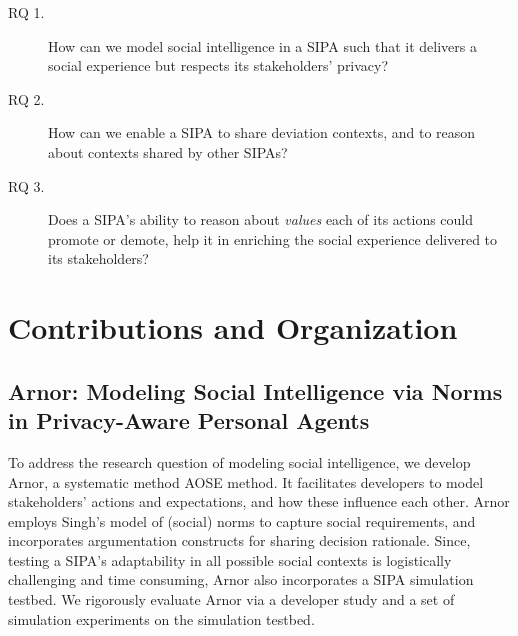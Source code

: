 \documentclass[11pt,          %
               phd,           %
               onehalfspacing %
               ]{ncsuthesis}
\newcommand{\fsl}{\textsl}
\newcommand{\frameworkA}{Arnor\xspace}
\begin{document}
\begin{description}

\item[RQ 1.] How can we model social intelligence in a SIPA such that it
delivers a social experience but respects its stakeholders' privacy?

\item[RQ 2.] How can we enable a SIPA to share deviation contexts, and to
reason about contexts shared by other SIPAs? 



\item[RQ 3.] Does a SIPA's ability to reason about \fsl{values} each of
its actions could promote or demote, help it in enriching the social
experience delivered to its stakeholders?

\end{description}

\section{Contributions and Organization}
\label{sec:intro-contributions}

\subsection[Modeling Soical Intelligence via Norms]{\frameworkA: Modeling Social Intelligence via Norms in 
Privacy-Aware Personal Agents}

To address the research question of modeling social intelligence, we
develop \frameworkA \citep{Ajmeri-AAMAS17-Arnor}, a systematic method
AOSE method. It facilitates developers to model stakeholders' actions
and expectations, and how these influence each other. \frameworkA
employs Singh's \citep{Singh-2013-Norms} model of (social) norms to
capture social requirements, and incorporates argumentation constructs
\citep{BenchCapon-2007-Argumentation+AI} for sharing decision rationale.
Since, testing a SIPA's adaptability in all possible social contexts is
logistically challenging and time consuming, \frameworkA also
incorporates a SIPA simulation testbed. We rigorously evaluate
\frameworkA via a developer study and a set of simulation experiments on
the simulation testbed. 
\end{document}

